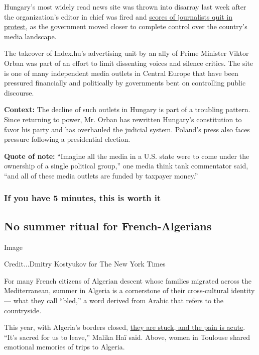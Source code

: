 Hungary's most widely read news site was thrown into disarray last week
after the organization's editor in chief was fired and
\href{https://www.nytimes.com/2020/07/24/world/europe/hungary-poland-media-freedom-index.html}{scores
of journalists quit in protest}, as the government moved closer to
complete control over the country's media landscape.

The takeover of Index.hu's advertising unit by an ally of Prime Minister
Viktor Orban was part of an effort to limit dissenting voices and
silence critics. The site is one of many independent media outlets in
Central Europe that have been pressured financially and politically by
governments bent on controlling public discourse.

\textbf{Context:} The decline of such outlets in Hungary is part of a
troubling pattern. Since returning to power, Mr. Orban has rewritten
Hungary's constitution to favor his party and has overhauled the
judicial system. Poland's press also faces pressure following a
presidential election.

\textbf{Quote of note:} ``Imagine all the media in a U.S. state were to
come under the ownership of a single political group,'' one media think
tank commentator said, ``and all of these media outlets are funded by
taxpayer money.''

\hypertarget{if-you-have-5-minutes-this-is-worth-it}{%
\subsubsection{If you have 5 minutes, this is worth
it}\label{if-you-have-5-minutes-this-is-worth-it}}

\hypertarget{no-summer-ritual-for-french-algerians}{%
\subsection{No summer ritual for
French-Algerians}\label{no-summer-ritual-for-french-algerians}}

Image

Credit...Dmitry Kostyukov for The New York Times

For many French citizens of Algerian descent whose families migrated
across the Mediterranean, summer in Algeria is a cornerstone of their
cross-cultural identity --- what they call ``bled,'' a word derived from
Arabic that refers to the countryside.

This year, with Algeria's borders closed,
\href{https://www.nytimes.com/2020/07/26/world/europe/france-algeria-summer-vacations.html}{they
are stuck, and the pain is acute}. ``It's sacred for us to leave,''
Malika Haï said. Above, women in Toulouse shared emotional memories of
trips to Algeria.

